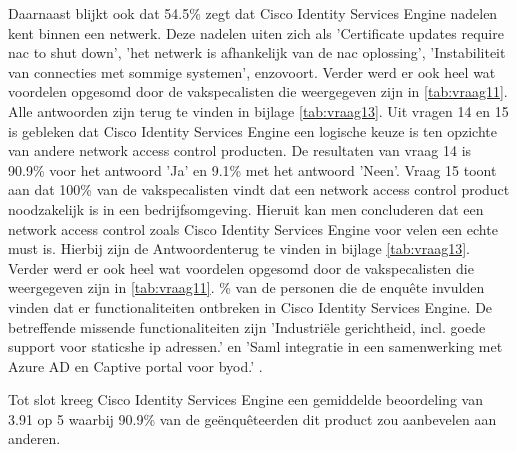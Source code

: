 Daarnaast blijkt ook dat 54.5\% zegt dat Cisco Identity Services Engine nadelen kent binnen een netwerk. Deze nadelen uiten zich als 'Certificate updates require nac to shut down', 'het netwerk is afhankelijk van de nac oplossing', 'Instabiliteit van connecties met sommige systemen', enzovoort. Verder werd er ook heel wat voordelen opgesomd door de vakspecalisten die weergegeven zijn in \ref{tab:vraag11}. Alle antwoorden zijn terug te vinden in bijlage \ref{tab:vraag13}.
\newline
\newline
Uit vragen 14 en 15 is gebleken dat Cisco Identity Services Engine een logische keuze is ten opzichte van andere network access control producten. De resultaten van vraag 14 is 90.9\% voor het antwoord 'Ja' en 9.1\% met het antwoord 'Neen'. Vraag 15 toont aan dat 100\% van de vakspecalisten vindt dat een network access control product noodzakelijk is in een bedrijfsomgeving. Hieruit kan men concluderen dat een network access control zoals Cisco Identity Services Engine voor velen een echte must is.
Hierbij zijn de Antwoordenterug te vinden in bijlage \ref{tab:vraag13}. Verder werd er ook heel wat voordelen opgesomd door de vakspecalisten die weergegeven zijn in \ref{tab:vraag11}.
\newline
{}\% van de personen die de enquête invulden vinden dat er functionaliteiten ontbreken in Cisco Identity Services Engine. De betreffende missende functionaliteiten zijn 'Industriële gerichtheid, incl. goede support voor staticshe ip adressen.' en 'Saml integratie in een samenwerking met Azure AD en Captive portal voor byod.’
.


Tot slot kreeg Cisco Identity Services Engine een gemiddelde beoordeling van 3.91 op 5 waarbij 90.9\% van de geënquêteerden dit product zou aanbevelen aan anderen.



